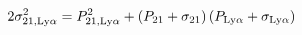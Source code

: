 \begin{equation}
    2 \sigma^2_{21, \rm Ly\alpha} = P^2_{21, \rm Ly\alpha} +
      \left(P_{21} + \sigma_{21} \right) \left( P_{\rm Ly\alpha} + \sigma_{\rm Ly\alpha}\right)
\end{equation}
